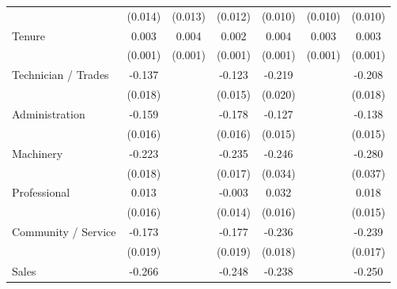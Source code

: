 {\begin{tabular}{l*{6}{c}}
                    &     (0.014)         &     (0.013)         &     (0.012)         &     (0.010)         &     (0.010)         &     (0.010)         \\
Tenure              &       0.003\sym{***}&       0.004\sym{***}&       0.002\sym{***}&       0.004\sym{***}&       0.003\sym{***}&       0.003\sym{***}\\
                    &     (0.001)         &     (0.001)         &     (0.001)         &     (0.001)         &     (0.001)         &     (0.001)         \\
Technician / Trades &      -0.137\sym{***}&                     &      -0.123\sym{***}&      -0.219\sym{***}&                     &      -0.208\sym{***}\\
                    &     (0.018)         &                     &     (0.015)         &     (0.020)         &                     &     (0.018)         \\
Administration      &      -0.159\sym{***}&                     &      -0.178\sym{***}&      -0.127\sym{***}&                     &      -0.138\sym{***}\\
                    &     (0.016)         &                     &     (0.016)         &     (0.015)         &                     &     (0.015)         \\
Machinery           &      -0.223\sym{***}&                     &      -0.235\sym{***}&      -0.246\sym{***}&                     &      -0.280\sym{***}\\
                    &     (0.018)         &                     &     (0.017)         &     (0.034)         &                     &     (0.037)         \\
Professional        &       0.013         &                     &      -0.003         &       0.032\sym{**} &                     &       0.018         \\
                    &     (0.016)         &                     &     (0.014)         &     (0.016)         &                     &     (0.015)         \\
Community / Service &      -0.173\sym{***}&                     &      -0.177\sym{***}&      -0.236\sym{***}&                     &      -0.239\sym{***}\\
                    &     (0.019)         &                     &     (0.019)         &     (0.018)         &                     &     (0.017)         \\
Sales               &      -0.266\sym{***}&                     &      -0.248\sym{***}&      -0.238\sym{***}&                     &      -0.250\sym{***}\\

\end{tabular}}

